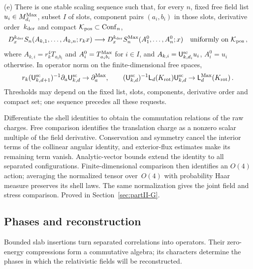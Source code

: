 \begin{proposition}
(e) There is one stable scaling sequence such that, for every $n$, fixed free field list $u_i\in M_{d_i}^{\mathrm{Max}}$, subset $I$ of slots, component pairs $(a_i,b_i)$ in those slots, derivative order~$k_{\rm der}$ and compact $\mathcal K_{\rm pos}\subset\mathrm{Conf}_{n}$,
\begin{equation}\label{eq:P7-5}
D_x^{k_{\rm der}} S_n(A_{k,1},\ldots,A_{k,n};r_kx)\longrightarrow D_x^{k_{\rm der}}S^{\mathrm{Max}}_n(A^0_1,\ldots,A^0_n;x)
\quad\hbox{uniformly on }\mathcal K_{\rm pos}\,,
\end{equation}
where $A_{k,i}=r_k^4T_{a_ib_i}$ and $A_i^0=T^{\mathrm{Max}}_{a_ib_i}$ for $i\in I$, and $A_{k,i}=\mathsf{U}_{k,d_i}^{\mathrm{sc}}u_i$, $A_i^0=u_i$ otherwise. In operator norm on the finite-dimensional free spaces,
\begin{equation}\label{eq:P7-6}
r_k(\mathsf{U}_{k,d+1}^{\mathrm{sc}})^{-1}\partial_a\mathsf{U}_{k,d}^{\mathrm{sc}}\to\partial_a^{\rm Max},\qquad
(\mathsf{U}_{k,d}^{\mathrm{sc}})^{-1}\mathsf L_d(K_{\rm rot})\mathsf{U}_{k,d}^{\mathrm{sc}}\to\mathsf L_d^{\rm Max}(K_{\rm rot})\,.
\end{equation}
Thresholds may depend on the fixed list, slots, components, derivative order and compact set; one sequence precedes all these requests.
\end{proposition}

Differentiate the shell identities to obtain the commutation relations of the
raw charges. Free comparison identifies the translation charge as a nonzero
scalar multiple of the field derivative. Conservation and symmetry cancel the
interior terms of the collinear angular identity, and exterior-flux estimates
make its remaining term vanish. Analytic-vector bounds extend the identity to
all separated configurations. Finite-dimensional comparison then identifies an
$O(4)$ action; averaging the normalized tensor over~$O(4)$ with probability Haar measure preserves its shell laws.
The same normalization gives the joint field and stress comparison.
Proved in Section~\ref{sec:partII-G}.

\subsection{Phases and reconstruction}

Bounded slab insertions turn separated correlations into operators. Their
zero-energy compressions form a commutative algebra; its characters determine
the phases in which the relativistic fields will be reconstructed.

